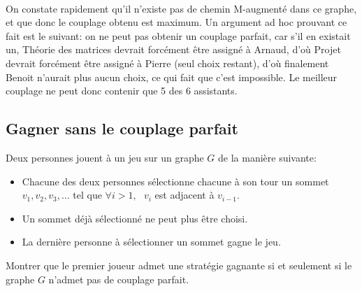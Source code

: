 \begin{solution}
\\
	On constate rapidement qu'il n'existe pas de chemin M-augmenté dans ce graphe, et que donc le couplage obtenu est maximum. Un argument ad hoc prouvant ce fait est le suivant: on ne peut pas obtenir un couplage parfait, car s'il en existait un, Théorie des matrices devrait forcément être assigné à Arnaud, d'où Projet devrait forcément être assigné à Pierre (seul choix restant), d'où finalement Benoit n'aurait plus aucun choix, ce qui fait que c'est impossible. Le meilleur couplage ne peut donc contenir que 5 des 6 assistants.
\end{solution}

\subsection{Gagner sans le couplage parfait}
Deux personnes jouent à un jeu sur un graphe $G$ de la manière suivante:

\begin{itemize}
  \item Chacune des deux personnes sélectionne chacune à son tour un sommet $v_1, v_2, v_3, …$ tel que $\forall i > 1, \ \ \ v_i$ est adjacent à $v_{i-1}$.
  \item Un sommet déjà sélectionné ne peut plus être choisi.
  \item La dernière personne à sélectionner un sommet gagne le jeu.
\end{itemize}

Montrer que le premier joueur admet une stratégie gagnante si et seulement si le graphe $G$ n'admet pas de couplage parfait.

